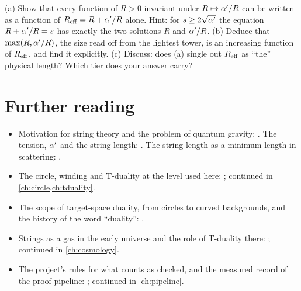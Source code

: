 \begin{exercise}[$\star\star\star$]\label{exr:intro:invariants}
(a) Show that every function of $R>0$ invariant under $R\mapsto\alpha'/R$ can be written as a
function of $R_{\rm eff}=R+\alpha'/R$ alone. Hint: for $s\ge2\sqrt{\alpha'}$ the equation $R+\alpha'/R=s$
has exactly the two solutions $R$ and $\alpha'/R$. (b) Deduce that $\max(R,\alpha'/R)$, the size read
off from the lightest tower, is an increasing function of $R_{\rm eff}$, and find it explicitly.
(c) Discuss: does (a) single out $R_{\rm eff}$ as ``the'' physical length? Which tier does your
answer carry?
\end{exercise}

\section*{Further reading}

\begin{itemize}[leftmargin=*,itemsep=2pt]
\item Motivation for string theory and the problem of quantum gravity: . The tension, $\alpha'$ and the string length: .
The string length as a minimum length in scattering: .
\item The circle, winding and T-duality at the level used here:
; continued in \cref{ch:circle,ch:tduality}.
\item The scope of target-space duality, from circles to curved backgrounds, and the history
of the word ``duality'': .
\item Strings as a gas in the early universe and the role of T-duality there:
; continued in \cref{ch:cosmology}.
\item The project's rules for what counts as checked, and the measured record of the proof
pipeline: ; continued in
\cref{ch:pipeline}.
\end{itemize}
